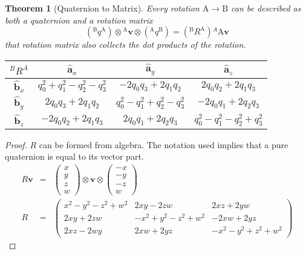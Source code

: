 \documentclass{amsart}
\newtheorem{theorem}{Theorem}[section]
\theoremstyle{definition}
\theoremstyle{remark}
\numberwithin{equation}{section}
\begin{document}
\begin{theorem}[Quaternion to Matrix]
  Every rotation $\mathrm{A}\to\mathrm{B}$ can be described as both a quaternion and a rotation matrix
  \begin{equation}
    \left({^\mathrm{B}q^\mathrm{A}}\right) \otimes {^\mathrm{A}\mathbf{v}} \otimes \left({^\mathrm{A}q^\mathrm{B}}\right) = \left({^\mathrm{B}R^\mathrm{A}}\right){^A\mathrm{A}\mathbf{v}}
  \end{equation}
  that rotation matrix also collects the dot products of the rotation.
  
  \begin{tabular}{c|ccc}
    ${^BR^A}$ & $\hat{\mathbf{a}}_x$ & $\hat{\mathbf{a}}_y$ & $\hat{\mathbf{a}}_z$ \\
    \hline
    $\hat{\mathbf{b}}_x$ & $q_0^2+q_1^2-q_2^2-q_3^2$ & $-2q_0q_3+2q_1q_2$ & $2q_0q_2 + 2q_1q_3$ \\
    $\hat{\mathbf{b}}_y$ & $2q_0q_3+2q_1q_2$ & $q_0^2-q_1^2+q_2^2-q_3^2$ &  $-2q_0q_1 + 2q_2q_3$ \\
    $\hat{\mathbf{b}}_z$ & $-2q_0q_2+2q_1q_3$ & $2q_0q_1+2q_2q_3$ & $q_0^2-q_1^2-q_2^2+q_3^2$
  \end{tabular}\centering
\end{theorem}
\begin{proof}
  $R$ can be formed from algebra. The notation used implies that a pure quaternion is equal to its vector part.
  \begin{eqnarray}
    R \mathbf{v} &=&
    \begin{pmatrix}
      x \\
      y \\
      z \\
      w
    \end{pmatrix} \otimes
    \mathbf{v} \otimes
    \begin{pmatrix}
      -x \\
      -y \\
      -z \\
      w
    \end{pmatrix} \nonumber \\
    R &=&
    \begin{pmatrix}
      x^2-y^2-z^2+w^2 & 2xy-2zw & 2xz+2yw \\
      2xy+2zw & -x^2+y^2-z^2+w^2 & -2xw+2yz \\
      2xz-2wy & 2xw+2yz & -x^2-y^2+z^2+w^2
    \end{pmatrix}
  \end{eqnarray} 
\end{proof}
\end{document}
